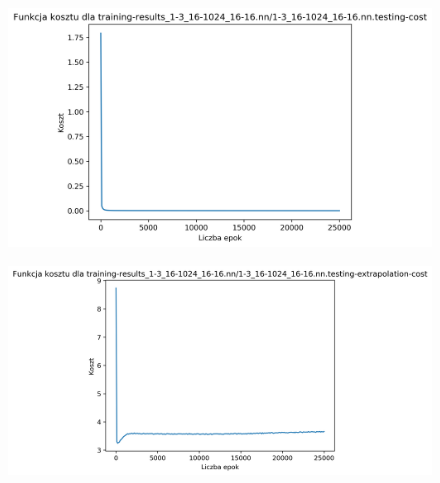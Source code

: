\documentclass{classrep}
\begin{document}
{{{\begin{figure}[!htbp]
                \end{figure}
                \begin{figure}[!htbp]
                    \centering
                    \includegraphics[width=120mm]{wykresy/1-3_16-1024_16-16_nn_testing-cost.png}
                \end{figure}
                \begin{figure}[!htbp]
                    \centering
                    \includegraphics[width=140mm]{wykresy/1-3_16-1024_16-16_nn_testing-extrapolation-cost.png}
                \end{figure}
                \FloatBarrier
            }

}}
\end{document}
